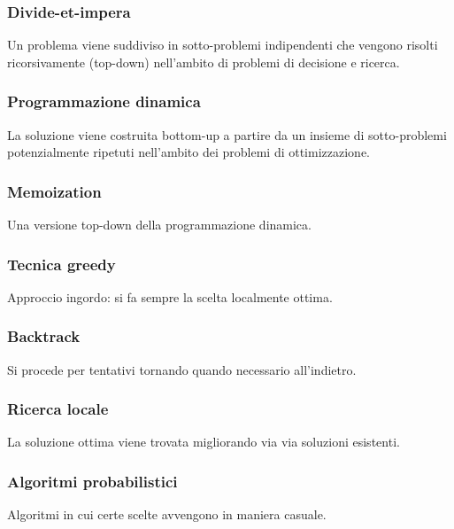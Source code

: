 \subsubsection{Divide-et-impera}
Un problema viene suddiviso in sotto-problemi indipendenti che vengono risolti ricorsivamente (top-down) nell'ambito di problemi di decisione e ricerca.
\subsubsection{Programmazione dinamica}
La soluzione viene costruita bottom-up a partire da un insieme di sotto-problemi potenzialmente ripetuti nell'ambito dei problemi di ottimizzazione.
\subsubsection{Memoization}
Una versione top-down della programmazione dinamica.
\subsubsection{Tecnica greedy}
Approccio ingordo: si fa sempre la scelta localmente ottima.
\subsubsection{Backtrack}
Si procede per tentativi tornando quando necessario all'indietro.
\subsubsection{Ricerca locale}
La soluzione ottima viene trovata migliorando via via soluzioni esistenti.
\subsubsection{Algoritmi probabilistici}
Algoritmi in cui certe scelte avvengono in maniera casuale. 
